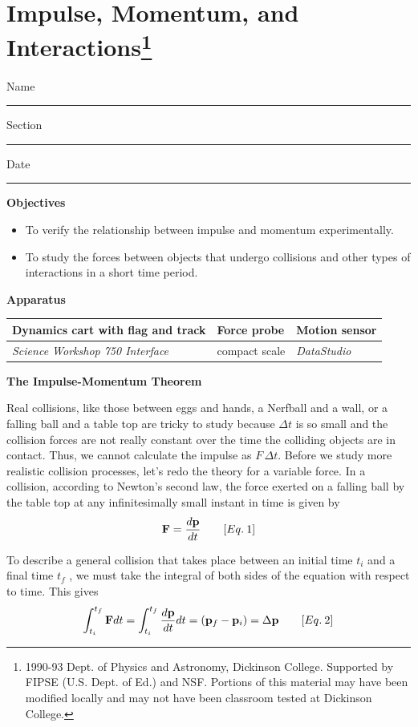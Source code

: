 
\section{Impulse, Momentum, and Interactions\footnote{
1990-93 Dept. of Physics and Astronomy, Dickinson College. Supported by FIPSE
(U.S. Dept. of Ed.) and NSF. Portions of this material may have been modified
locally and may not have been classroom tested at Dickinson College.
}}

Name \rule{2.0in}{0.1pt}\hfill{}Section \rule{1.0in}{0.1pt}\hfill{}Date \rule{1.0in}{0.1pt}

\textbf{Objectives }

\begin{itemize}
\item To verify the relationship between impulse and momentum experimentally. 
\item To study the forces between objects that undergo collisions and other types of interactions in a short time period.
\end{itemize}
\textbf{Apparatus} 

\begin{center}
\begin{tabular}{|l|l|l|} \hline
Dynamics cart with flag and track   & Force probe   & Motion sensor \\ \hline
{\it Science Workshop 750 Interface}& compact scale & {\it DataStudio} \\ \hline
\end{tabular}
\end{center}

\textbf{The Impulse-Momentum Theorem }

Real collisions, like those between eggs and hands, a Nerfball and a wall, or
a falling ball and a table top are tricky to study because $\Delta t$ 
is so small and
the collision forces are not really constant over the time the colliding objects
are in contact. Thus, we cannot calculate the impulse as $F \,\Delta t$. 
Before we study
more realistic collision processes, let's redo the theory for a variable force.
In a collision, according to Newton's second law, the force exerted on a falling
ball by the table top at any infinitesimally small instant in time is given
by
\[
{\bf F}=\frac{d{\bf p}}{dt}\qquad [Eq.\: 1]\]


To describe a general collision that takes place between an initial time \( t_{i} \)
and a final time \( t_{f} \) , we must take the integral of both sides of the
equation with respect to time. This gives
\[
\int _{t_{i}}^{t_{f}}{\bf F}dt=\int _{t_{i}}^{t_{f}}\frac{d{\bf p}}{dt}dt=\left( {{\bf p}_{f}}-{{\bf p}_{i}}\right) =\Delta {\bf p}\qquad [Eq.\: 2]\]


